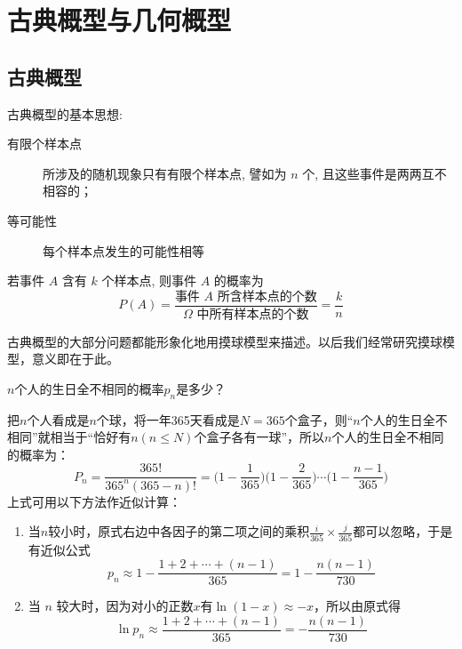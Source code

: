 \section{古典概型与几何概型}

\subsection{古典概型}

古典概型的基本思想:
\begin{description}
    \item[有限个样本点] 所涉及的随机现象只有有限个样本点, 譬如为 $n$ 个, 且这些事件是两两互不相容的；
    \item[等可能性] 每个样本点发生的可能性相等
\end{description}

\begin{definition}[古典概型]
    若事件 $A$ 含有 $k$ 个样本点, 则事件 $A$ 的概率为
    \[  P (A) = \frac{\text{事件 } A \text{ 所含样本点的个数}}{\Omega \text{ 中所有样本点的个数}} = \frac{k}{n} \]
\end{definition}

\begin{note}
    古典概型的大部分问题都能形象化地用摸球模型来描述。以后我们经常研究摸球模型，意义即在于此。
\end{note}

\begin{example}[生日问题]
    $n$个人的生日全不相同的概率$p_n$是多少？
\end{example}
\begin{solution}
    把$n$个人看成是$n$个球，将一年365天看成是$N=365$个盒子，则“$n$个人的生日全不相同”就相当于“恰好有$n (n \le N)$个盒子各有一球”，所以$n$个人的生日全不相同的概率为：
    \[ P_n = \frac{365!}{365^n (365 - n)!} = \biggl(1 - \frac1{365}\biggr) \biggl(1 - \frac{2}{365}\biggr) \dotsb \biggl(1 - \frac{n - 1}{365}\biggr) \]
    上式可用以下方法作近似计算：
    \begin{enumerate}
        \item 当$n$较小时，原式右边中各因子的第二项之间的乘积$\frac{i}{365} \times \frac{j}{365}$都可以忽略，于是有近似公式
              \[ p_n \approx 1 - \frac{1 + 2 + \dotsb + (n - 1)}{365}  = 1 - \frac{n (n - 1)}{730}\]
        \item 当 $n$ 较大时，因为对小的正数$x$有$\ln (1-x) \approx -x$，所以由原式得
              \[ \ln p_n \approx \frac{1 + 2 + \dotsb + (n - 1)}{365} = -\frac{n (n - 1)}{730}\]
    \end{enumerate}
\end{solution}

